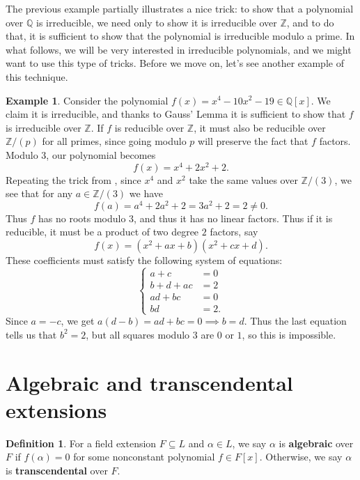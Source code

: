 \documentclass[12pt]{report}
\numberwithin{equation}{section}
\numberwithin{theorem}{chapter}
\theoremstyle{definition}
\newtheorem{definition}[theorem]{Definition}
\newtheorem{example}[theorem]{Example}
\newtheorem*{basic properties}{Basic Properties}
\newtheorem*{Important Remark}{Important Remark}
\newcommand{\df}[1]{{\bf #1}\index{#1}}
\begin{document}
The previous example partially illustrates a nice trick: to show that a polynomial over $\mathbb{Q}$ is irreducible, we need only to show it is irreducible over $\mathbb{Z}$, and to do that, it is sufficient to show that the polynomial is irreducible modulo a prime. In what follows, we will be very interested in irreducible polynomials, and we might want to use this type of tricks. Before we move on, let's see another example of this technique.

\begin{example}
	Consider the polynomial $f(x) = x^4-10x^2-19 \in \mathbb{Q}[x]$. We claim it is irreducible, and thanks to Gauss' Lemma it is sufficient to show that $f$ is irreducible over $\mathbb{Z}$. If $f$ is reducible over $\mathbb{Z}$, it must also be reducible over $\mathbb{Z}/(p)$ for all primes, since going modulo $p$ will preserve the fact that $f$ factors. Modulo $3$, our polynomial becomes
	 $$f(x) = x^4+2x^2+2.$$
	 Repeating the trick from , since $x^4$ and $x^2$ take the same values over $\mathbb{Z}/(3)$, we see that for any $a \in \mathbb{Z}/(3)$ we have
	  $$f(a) = a^4+2a^2+2 = 3a^2+2=2 \neq 0.$$
	Thus $f$ has no roots modulo $3$, and thus it has no linear factors. Thus if it is reducible, it must be a product of two degree $2$ factors, say
	$$f(x) = (x^2+ax+b)(x^2+cx+d).$$
These coefficients must satisfy the following system of equations:
$$\left\lbrace
\begin{array}{ll}
	a+c & = 0 \\
	b+d+ac & = 2 \\
	ad+bc & = 0 \\
	bd & = 2.
\end{array}
\right.$$
Since $a=-c$, we get $a(d-b)=ad+bc = 0 \implies b=d$. Thus the last equation tells us that $b^2=2$, but all squares modulo $3$ are $0$ or $1$, so this is impossible.
\end{example}







\section{Algebraic and transcendental extensions}

\begin{definition}
For a field extension $F \subseteq L$ and $\alpha \in L$, we say $\alpha$ is \df{algebraic} over $F$ if $f(\alpha) = 0$ for some nonconstant polynomial $f \in F[x]$. Otherwise, we say $\alpha$ is \df{transcendental} over $F$.
\end{definition}
\end{document}
